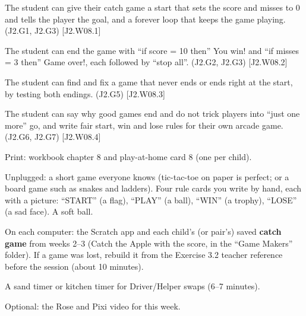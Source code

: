 
\begin{objectives}
  \item The student can give their catch game a start that sets the score and misses to 0 and tells the player the goal, and a forever loop that keeps the game playing. (J2.G1, J2.G3) [J2.W08.1]
  \item The student can end the game with \enquote{if score = 10 then} You win! and \enquote{if misses = 3 then} Game over!, each followed by \enquote{stop all}. (J2.G2, J2.G3) [J2.W08.2]
  \item The student can find and fix a game that never ends or ends right at the start, by testing both endings. (J2.G5) [J2.W08.3]
  \item The student can say why good games end and do not trick players into \enquote{just one more} go, and write fair start, win and lose rules for their own arcade game. (J2.G6, J2.G7) [J2.W08.4]
\end{objectives}

\begin{materials}
  \item Print: workbook chapter 8 and play-at-home card 8 (one per child).
  \item Unplugged: a short game everyone knows (tic-tac-toe on paper is perfect; or a board game such as snakes and ladders). Four rule cards you write by hand, each with a picture: \enquote{START} (a flag), \enquote{PLAY} (a ball), \enquote{WIN} (a trophy), \enquote{LOSE} (a sad face). A soft ball.
  \item On each computer: the Scratch app and each child's (or pair's) saved \textbf{catch game} from weeks 2--3 (Catch the Apple with the score, in the \enquote{Game Makers} folder). If a game was lost, rebuild it from the Exercise 3.2 teacher reference before the session (about 10 minutes).
  \item A sand timer or kitchen timer for Driver/Helper swaps (6--7 minutes).
  \item Optional: the Rose and Pixi video for this week.
\end{materials}

